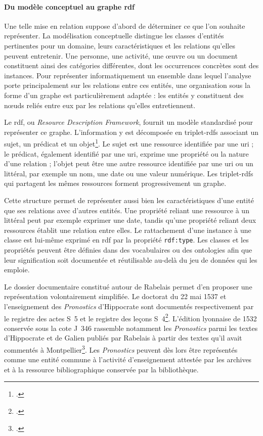 \paragraph{Du modèle conceptuel au graphe \gls{rdf}}

Une telle mise en relation suppose d'abord de déterminer ce que l'on souhaite représenter. La modélisation conceptuelle distingue les classes d'entités pertinentes pour un domaine, leurs caractéristiques et les relations qu'elles peuvent entretenir. Une personne, une activité, une œuvre ou un document constituent ainsi des catégories différentes, dont les occurrences concrètes sont des instances. Pour représenter informatiquement un ensemble dans lequel l'analyse porte principalement sur les relations entre ces entités, une organisation sous la forme d'un graphe est particulièrement adaptée : les entités y constituent des nœuds reliés entre eux par les relations qu'elles entretiennent.

Le \gls{rdf}, ou \emph{Resource Description Framework}, fournit un modèle standardisé pour représenter ce graphe. L'information y est décomposée en \glspl{triplet-rdf} associant un sujet, un prédicat et un objet\footcite{W3CRDF11Concepts}. Le sujet est une ressource identifiée par une \gls{uri} ; le prédicat, également identifié par une \gls{uri}, exprime une propriété ou la nature d'une relation ; l'objet peut être une autre ressource identifiée par une \gls{uri} ou un littéral, par exemple un nom, une date ou une valeur numérique. Les \glspl{triplet-rdf} qui partagent les mêmes ressources forment progressivement un graphe.

Cette structure permet de représenter aussi bien les caractéristiques d'une entité que ses relations avec d'autres entités. Une propriété reliant une ressource à un littéral peut par exemple exprimer une date, tandis qu'une propriété reliant deux ressources établit une relation entre elles. Le rattachement d'une instance à une classe est lui-même exprimé en \gls{rdf} par la propriété \verb|rdf:type|. Les classes et les propriétés peuvent être définies dans des vocabulaires ou des \glspl{ontologie} afin que leur signification soit documentée et réutilisable au-delà du jeu de données qui les emploie.

Le dossier documentaire constitué autour de Rabelais permet d'en proposer une représentation volontairement simplifiée. Le doctorat du 22 mai 1537 et l'enseignement des \emph{Pronostics} d'Hippocrate sont documentés respectivement par le registre des actes S~5 et le registre des leçons S~4\footcite{LorblanchetRabelais2}. L'édition lyonnaise de 1532 conservée sous la cote J~346 rassemble notamment les \emph{Pronostics} parmi les textes d'Hippocrate et de Galien publiés par Rabelais à partir des textes qu'il avait commentés à Montpellier\footcite{LorblanchetRabelais4}. Les \emph{Pronostics} peuvent dès lors être représentés comme une entité commune à l'activité d'enseignement attestée par les archives et à la ressource bibliographique conservée par la bibliothèque.

